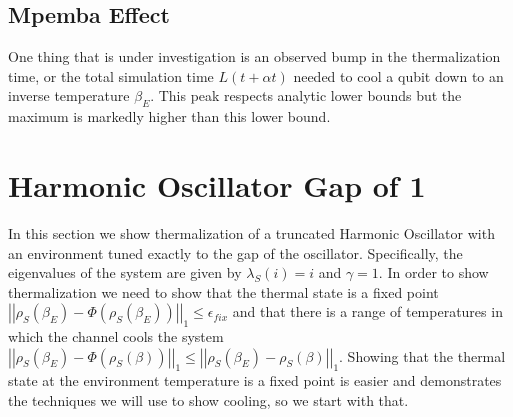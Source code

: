 \documentclass{article}
\newcommand{\norm}[1]{\left| \left| #1 \right| \right|}
\begin{document}
\subsection{Mpemba Effect}
One thing that is under investigation is an observed bump in the thermalization time, or the total simulation time $L  (t + \alpha t)$ needed to cool a qubit down to an inverse temperature $\beta_E$. This peak respects analytic lower bounds but the maximum is markedly higher than this lower bound. 


 
\section{Harmonic Oscillator Gap of 1}

In this section we show thermalization of a truncated Harmonic Oscillator with an environment tuned exactly to the gap of the oscillator. Specifically, the eigenvalues of the system are given by $\lambda_S(i) = i$ and $\gamma = 1$. In order to show thermalization we need to show that the thermal state is a fixed point $\norm{\rho_S(\beta_E) - \Phi(\rho_S(\beta_E))}_1 \leq \epsilon_{fix}$ and that there is a range of temperatures in which the channel cools the system $\norm{\rho_S(\beta_E) - \Phi(\rho_S(\beta))}_1 \leq \norm{\rho_S(\beta_E) - \rho_S(\beta)}_1$. Showing that the thermal state at the environment temperature is a fixed point is easier and demonstrates the techniques we will use to show cooling, so we start with that.
\end{document}
